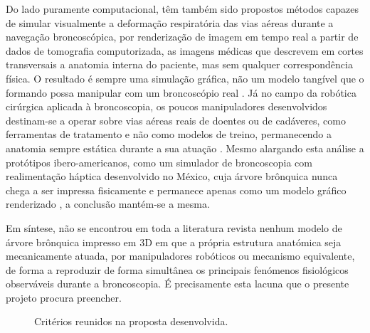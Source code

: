 Do lado puramente computacional, têm também sido propostos métodos capazes de simular visualmente a deformação respiratória das vias aéreas durante a navegação broncoscópica, por renderização de imagem em tempo real a partir de dados de tomografia computorizada, as imagens médicas que descrevem em cortes transversais a anatomia interna do paciente, mas sem qualquer correspondência física. O resultado é sempre uma simulação gráfica, não um modelo tangível que o formando possa manipular com um broncoscópio real \parencite{DunnBeltran2026}. Já no campo da robótica cirúrgica aplicada à broncoscopia, os poucos manipuladores desenvolvidos destinam-se a operar sobre vias aéreas reais de doentes ou de cadáveres, como ferramentas de tratamento e não como modelos de treino, permanecendo a anatomia sempre estática durante a sua atuação \parencite{Gafford2019}. Mesmo alargando esta análise a protótipos ibero-americanos, como um simulador de broncoscopia com realimentação háptica desenvolvido no México, cuja árvore brônquica nunca chega a ser impressa fisicamente e permanece apenas como um modelo gráfico renderizado \parencite{IPN2012}, a conclusão mantém-se a mesma.

Em síntese, não se encontrou em toda a literatura revista nenhum modelo de árvore brônquica impresso em 3D em que a própria estrutura anatómica seja mecanicamente atuada, por manipuladores robóticos ou mecanismo equivalente, de forma a reproduzir de forma simultânea os principais fenómenos fisiológicos observáveis durante a broncoscopia. É precisamente esta lacuna que o presente projeto procura preencher.

\begin{figure}[H]
  \centering
  \caption{Critérios reunidos na proposta desenvolvida.}
  \label{fig:sintese-criterios-projeto}
\end{figure}

